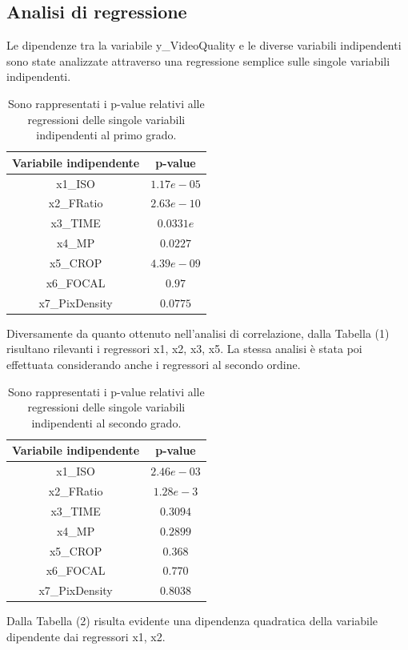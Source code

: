 \subsection{Analisi di regressione}
Le dipendenze tra la variabile y\_VideoQuality e le diverse variabili indipendenti sono state analizzate attraverso una regressione semplice sulle singole variabili indipendenti.
\begin{table}[H]
	\centering
	\begin{tabular}{|c|c|}
		\hline
		\textbf{Variabile indipendente} & \textbf{p-value} \\
		\hline
		x1\_ISO & $1.17e-05$ \\
		\hline
		x2\_FRatio & $2.63e-10$ \\ 
		\hline
		x3\_TIME & $0.0331e$ \\
		\hline
		x4\_MP & $0.0227$ \\
		\hline
		x5\_CROP & $4.39e-09$ \\
		\hline
		x6\_FOCAL & $0.97$ \\
		\hline
		x7\_PixDensity & $0.0775$ \\
		\hline
	\end{tabular}
	\caption{Sono rappresentati i p-value relativi alle regressioni delle singole variabili indipendenti al primo grado.}
	\label{tab:}
\end{table}
Diversamente da quanto ottenuto nell'analisi di correlazione, dalla Tabella (1) risultano rilevanti i regressori x1, x2, x3, x5. La stessa analisi è stata poi effettuata considerando anche i regressori al secondo ordine.

\begin{table}[H]
	\centering
	\begin{tabular}{|c|c|}
		\hline
		\textbf{Variabile indipendente} & \textbf{p-value} \\
		\hline
		x1\_ISO & $2.46e-03$ \\
		\hline
		x2\_FRatio & $1.28e-3$ \\ 
		\hline
		x3\_TIME & $0.3094$ \\
		\hline
		x4\_MP & $0.2899$ \\
		\hline
		x5\_CROP & $0.368$ \\
		\hline
		x6\_FOCAL & $0.770$ \\
		\hline
		x7\_PixDensity & $0.8038$ \\
		\hline
	\end{tabular}
	\caption{Sono rappresentati i p-value relativi alle regressioni delle singole variabili indipendenti al secondo grado.}
	\label{tab:}
\end{table}
Dalla Tabella (2) risulta evidente una dipendenza quadratica della variabile dipendente dai regressori x1, x2.

